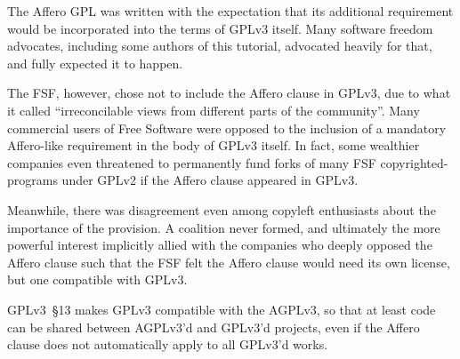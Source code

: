 The Affero GPL was written with the expectation that its
additional requirement would be incorporated into the terms of GPLv3
itself.  Many software freedom advocates, including some authors of this
tutorial, advocated heavily for that, and fully expected it to happen.

The FSF, however, chose not to include the Affero clause in GPLv3, due to
what it called  ``irreconcilable views from
different parts of the community''.  Many
commercial users of Free Software were opposed to the inclusion of a
mandatory Affero-like requirement in the body of GPLv3 itself.  In fact, some
wealthier companies even threatened to permanently fund forks of many FSF
copyrighted-programs under GPLv2 if the Affero clause appeared in GPLv3.

Meanwhile, there was disagreement even among copyleft enthusiasts about the
importance of the provision.  A coalition never formed, and ultimately the
more powerful interest implicitly allied with the companies who deeply opposed
the Affero clause such that the FSF felt the Affero clause would need its own
license, but one compatible with GPLv3. 

GPLv3~\S13 makes GPLv3 compatible with the AGPLv3, so that at least code can
be shared between AGPLv3'd and GPLv3'd projects, even if the Affero clause
does not automatically apply to all GPLv3'd works.



